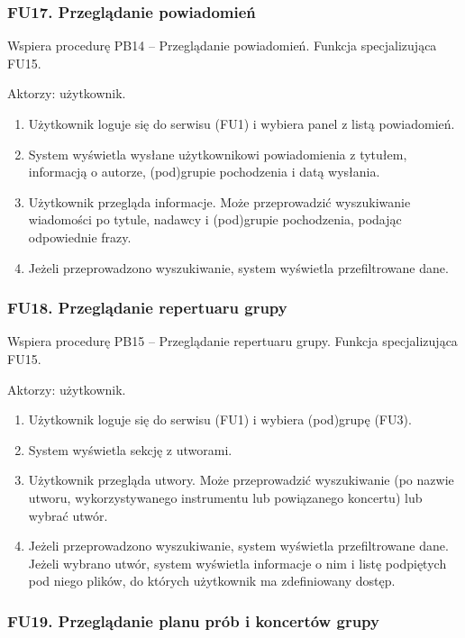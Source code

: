 \documentclass[11pt,a4paper]{article}
\renewcommand{\_}{\char`_}
\begin{document}
\subsubsection{FU17. Przeglądanie powiadomień}

Wspiera procedurę PB14 – Przeglądanie powiadomień. Funkcja specjalizująca FU15.

Aktorzy: użytkownik.
\begin{enumerate}
    \item Użytkownik loguje się do serwisu (FU1) i wybiera panel z listą powiadomień.
    \item System wyświetla wysłane użytkownikowi powiadomienia z tytułem, informacją o autorze, (pod)grupie pochodzenia i datą wysłania.
    \item Użytkownik przegląda informacje. Może przeprowadzić wyszukiwanie wiadomości po tytule, nadawcy i (pod)grupie pochodzenia, podając odpowiednie frazy.
    \item Jeżeli przeprowadzono wyszukiwanie, system wyświetla przefiltrowane dane.
\end{enumerate}

\subsubsection{FU18. Przeglądanie repertuaru grupy}

Wspiera procedurę PB15 – Przeglądanie repertuaru grupy. Funkcja specjalizująca FU15.

Aktorzy: użytkownik.
\begin{enumerate}
    \item Użytkownik loguje się do serwisu (FU1) i wybiera (pod)grupę (FU3).
    \item System wyświetla sekcję z utworami.
    \item Użytkownik przegląda utwory. Może przeprowadzić wyszukiwanie (po nazwie utworu, wykorzystywanego instrumentu lub powiązanego koncertu) lub wybrać utwór.
    \item Jeżeli przeprowadzono wyszukiwanie, system wyświetla przefiltrowane dane. Jeżeli wybrano utwór, system wyświetla informacje o nim i listę podpiętych pod niego plików, do których użytkownik ma zdefiniowany dostęp.
\end{enumerate}

\subsubsection{FU19. Przeglądanie planu prób i koncertów grupy}
\end{document}
